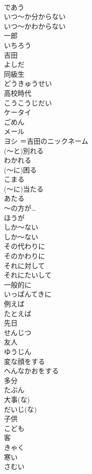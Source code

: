 \documentclass[8pt]{extreport}
\begin{document}
\begin{CJK}{UTF8}{min}
\\	であう
\\	いつ～か分からない	
\\	いつ～かわからない
\\	一郎	
\\	いちろう
\\	吉田	
\\	よしだ
\\	同級生	
\\	どうきゅうせい
\\	高校時代	
\\	こうこうじだい
\\	ケータイ	
\\	ごめん	
\\	メール	
\\	ヨシ	＝吉田のニックネーム	
\\	(～と)別れる	
\\	わかれる
\\	(～に)困る	
\\	こまる
\\	(～に)当たる	
\\	あたる
\\	～の方が…	
\\	ほうが
\\	しか～ない	
\\	しか～ない
\\	その代わりに	
\\	そのかわりに
\\	それに対して	
\\	それにたいして
\\	一般的に	
\\	いっぱんてきに
\\	例えば	
\\	たとえば
\\	先日	
\\	せんじつ
\\	友人	
\\	ゆうじん
\\	変な顔をする	
\\	へんなかおをする
\\	多分	
\\	たぶん
\\	大事(な)	
\\	だいじ(な)
\\	子供	
\\	こども
\\	客	
\\	きゃく
\\	寒い	
\\	さむい

\end{CJK}
\end{document}
